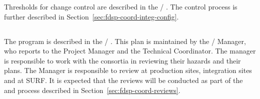 Thresholds for change control are described in the
/ . The control process is further
described in Section~\ref{sec:fdsp-coord-integ-config}.

\subsection{}
\label{sec:fdsp-coord-esh}

The   program is described in the
/ . This plan is maintained by
the /  Manager, who reports to the
 Project Manager and the Technical Coordinator. The
 manager is responsible to work with the consortia in
reviewing their hazards and their  plans.  The 
Manager is responsible to review  at production sites,
integration sites and at SURF. It is expected that the 
reviews will be conducted as part of the  and 
process described in Section~\ref{sec:fdsp-coord-reviews}.
